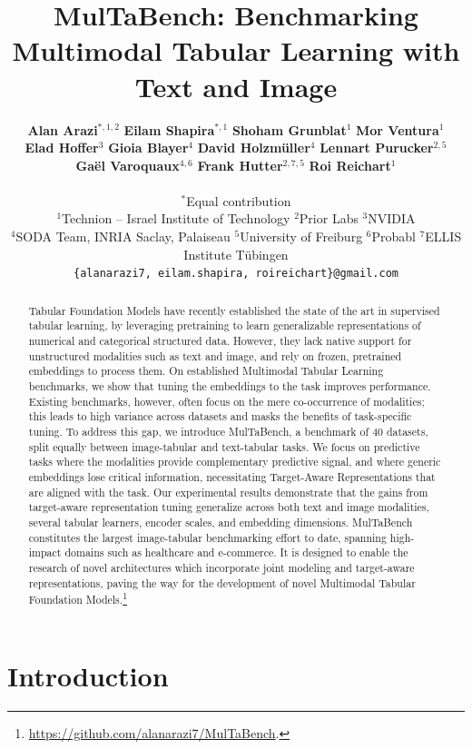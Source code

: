 \documentclass{article}
\title{MulTaBench: Benchmarking Multimodal Tabular Learning with Text and Image}
\author{
  \textbf{Alan Arazi}$^{*,1,2}$ \quad
  \textbf{Eilam Shapira}$^{*,1}$ \quad
  \textbf{Shoham Grunblat}$^{1}$ \quad
  \textbf{Mor Ventura}$^{1}$ \\
  \textbf{Elad Hoffer}$^{3}$ \quad
  \textbf{Gioia Blayer}$^{4}$ \quad
  \textbf{David Holzmüller}$^{4}$ \quad
  \textbf{Lennart Purucker}$^{2,5}$ \\
  \textbf{Gaël Varoquaux}$^{4,6}$ \quad
  \textbf{Frank Hutter}$^{2,7,5}$ \quad
  \textbf{Roi Reichart}$^{1}$ \\
  \vspace{0.5em} \\
  \small $^*$Equal contribution \\
  \small $^{1}$Technion -- Israel Institute of Technology \quad  $^{2}$Prior Labs \quad
  $^{3}$NVIDIA \\
  \small $^{4}$SODA Team, INRIA Saclay, Palaiseau \quad 
  $^{5}$University of Freiburg \quad
  $^{6}$Probabl \quad
  $^{7}$ELLIS Institute Tübingen\\
  \texttt{\{alanarazi7, eilam.shapira, roireichart\}@gmail.com}
}
\begin{document}
\maketitle


\begin{abstract}
Tabular Foundation Models have recently established the state of the art in supervised tabular learning, by leveraging pretraining to learn generalizable representations of numerical and categorical structured data. However, they lack native support for unstructured modalities such as text and image, and rely on frozen, pretrained embeddings to process them. On established Multimodal Tabular Learning benchmarks, we show that tuning the embeddings to the task improves performance. Existing benchmarks, however, often focus on the mere co-occurrence of modalities; this leads to high variance across datasets and masks the benefits of task-specific tuning. To address this gap, we introduce MulTaBench, a benchmark of 40 datasets, split equally between image-tabular and text-tabular tasks. We focus on predictive tasks where the modalities provide complementary predictive signal, and where generic embeddings lose critical information, necessitating Target-Aware Representations that are aligned with the task. Our experimental results demonstrate that the gains from target-aware representation tuning generalize across both text and image modalities, several tabular learners, encoder scales, and embedding dimensions. MulTaBench constitutes the largest image-tabular benchmarking effort to date, spanning high-impact domains such as healthcare and e-commerce. It is designed to enable the research of novel architectures which incorporate joint modeling and target-aware representations, paving the way for the development of novel Multimodal Tabular Foundation Models.\footnote{\url{https://github.com/alanarazi7/MulTaBench}.}
\end{abstract}


\section{Introduction}
\label{sec:introduction}
\end{document}
